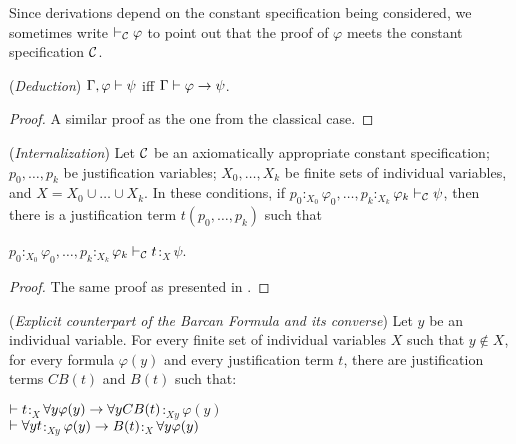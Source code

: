 \qquad Since derivations depend on the constant specification being considered, we sometimes write $\vdash_{\mathcal{C}} \varphi$ to point out that the proof of $\varphi$ meets the constant specification $\mathcal{C}$.

\begin{lema}
	(\textit{Deduction})  $\Gamma,\varphi \vdash \psi$ iff  $\Gamma \vdash \varphi \rightarrow \psi$.
\end{lema}

\begin{proof}
	A similar proof as the one from the classical case.
\end{proof}


\begin{teor}
	(\textit{Internalization}) Let $\mathcal{C}$ be an axiomatically appropriate constant specification; $p_{0}, \dots, p_{k}$ be justification variables; $X_{0}, \dots, X_{k}$ be finite sets of individual variables, and $X =X_{0} \cup \dots \cup X_{k}$. In these conditions, if  $p_{0}$$:_{X_{0}}$$\varphi_{0}, \dots, p_{k}$$:_{X_{k}}$$\varphi_{k} \vdash_{\mathcal{C}} \psi$, then there is a justification term $t(p_{0}, \dots, p_{k})$ such that 
	
	\begin{center}
		$p_{0}$$:_{X_{0}}$$\varphi_{0}, \dots, 
		p_{k}$$:_{X_{k}}$$\varphi_{k} \vdash_{\mathcal{C}} t$$:_{X}$$\psi$.
	\end{center}
	
\end{teor}

\begin{proof}
	The same proof as presented in \cite[p. 7]{Artemov11}.
\end{proof}



\begin{pro}
	(\textit{Explicit counterpart of the Barcan Formula and its converse}) Let $y$ be an individual variable. For  every finite set of individual variables $X$ such that $y \notin X$, for every formula $\varphi(y)$ and every justification term $t$, there are justification terms $CB(t)$ and $B(t)$ such that: 
	\begin{center}
		$\vdash t$$:_{X}$$\forall y \varphi(y) \rightarrow \forall y CB(t)$$:_{Xy}$$\varphi(y)$\\
		
		$\vdash \forall y t$$:_{Xy}$$\varphi(y) \rightarrow B(t)$$:_{X}$$\forall y \varphi(y)$
	\end{center}
\end{pro}



